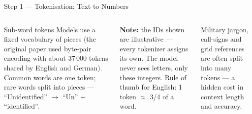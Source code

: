 \documentclass[aspectratio=169,10pt]{beamer}
\begin{document}
\begin{frame}{Step 1 --- Tokenisation: Text to Numbers}
\begin{columns}[T]
\begin{cbox}{Sub-word tokens}
Models use a fixed vocabulary of pieces (the original paper used byte-pair encoding with about 37\,000 tokens shared by English and German). Common words are one token; rare words split into pieces --- ``Unidentified'' $\to$ ``Un'' + ``identified''.
\end{cbox}
\begin{ibox}\scriptsize\textbf{Note:} the IDs shown are illustrative --- every tokenizer assigns its own. The model never sees letters, only these integers. Rule of thumb for English: 1 token $\approx$ 3/4 of a word.\end{ibox}
\begin{wbox}\scriptsize Military jargon, call-signs and grid references are often split into many tokens --- a hidden cost in context length and accuracy.\end{wbox}
\end{columns}
\end{frame}
\end{document}
